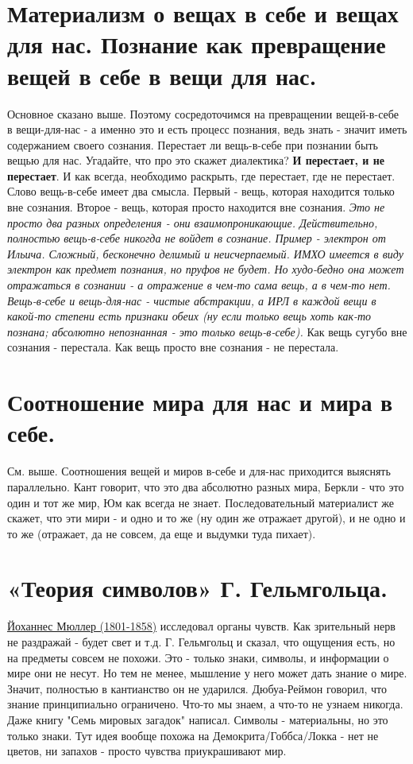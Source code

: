 \section{ Материализм о вещах в себе и вещах для нас. Познание как превращение вещей в себе в вещи для нас.}
Основное сказано выше. Поэтому сосредоточимся на превращении вещей-в-себе в вещи-для-нас - а именно это и есть процесс познания, ведь знать - значит иметь содержанием своего сознания. Перестает ли вещь-в-себе при познании быть вещью для нас. Угадайте, что про это скажет диалектика? \textbf{И перестает, и не перестает}. И как всегда, необходимо раскрыть, где перестает, где не перестает. Слово вещь-в-себе имеет два смысла. Первый - вещь, которая находится только вне сознания. Второе - вещь, которая просто находится вне сознания. \textit{Это не просто два разных определения - они взаимопроникающие. Действительно, полностью вещь-в-себе никогда не войдет в сознание. Пример - электрон от Ильича. Сложный, бесконечно делимый и неисчерпаемый. ИМХО имеется в виду электрон как предмет познания, но пруфов не будет. Но худо-бедно она может отражаться в сознании - а отражение в чем-то сама вещь, а в чем-то нет. Вещь-в-себе и вещь-для-нас - чистые абстракции, а ИРЛ в каждой вещи в какой-то степени есть признаки обеих (ну если только вещь хоть как-то познана; абсолютно непознанная - это только вещь-в-себе).} Как вещь сугубо вне сознания - перестала. Как вещь просто вне сознания - не перестала.

\section{ Соотношение мира для нас и мира в себе.}
См. выше. Соотношения вещей и миров в-себе и для-нас приходится выяснять параллельно. Кант говорит, что это два абсолютно разных мира, Беркли - что это один и тот же мир, Юм как всегда не знает. Последовательный материалист же скажет, что эти мири - и одно и то же (ну один же отражает другой), и не одно и то же (отражает, да не совсем, да еще и выдумки туда пихает).

\section{ «Теория символов» Г. Гельмгольца.}
\underline{Йоханнес Мюллер (1801-1858)} исследовал органы чувств. Как зрительный нерв не раздражай - будет свет и т.д. 
Г. Гельмгольц и сказал, что ощущения есть, но на предметы совсем не похожи. Это - только знаки, символы, и информации о мире они не несут. Но тем не менее, мышление у него может дать знание о мире. Значит, полностью в кантианство он не ударился. Дюбуа-Реймон говорил, что знание принципиально ограничено. Что-то мы знаем, а что-то не узнаем никогда. Даже книгу "Семь мировых загадок" написал. Символы - материальны, но это только знаки. Тут идея вообще похожа на Демокрита/Гоббса/Локка - нет не цветов, ни запахов - просто чувства приукрашивают мир.

